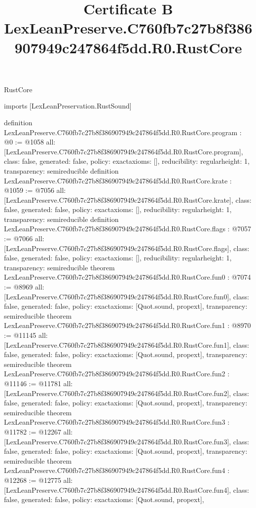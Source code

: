 \begin{lexlean}{RustCore}
\title{Certificate B LexLeanPreserve.C760fb7c27b8f386907949c247864f5dd.R0.RustCore}
\begin{coremodule}
imports [LexLeanPreservation.RustSound]

definition LexLeanPreserve.C760fb7c27b8f386907949c247864f5dd.R0.RustCore.program : @0 := @1058 {
  all: [LexLeanPreserve.C760fb7c27b8f386907949c247864f5dd.R0.RustCore.program],
  class: false,
  generated: false,
  policy: exact{axioms: []},
  reducibility: regular{height: 1},
  transparency: semireducible
}
definition LexLeanPreserve.C760fb7c27b8f386907949c247864f5dd.R0.RustCore.krate : @1059 := @7056 {
  all: [LexLeanPreserve.C760fb7c27b8f386907949c247864f5dd.R0.RustCore.krate],
  class: false,
  generated: false,
  policy: exact{axioms: []},
  reducibility: regular{height: 1},
  transparency: semireducible
}
definition LexLeanPreserve.C760fb7c27b8f386907949c247864f5dd.R0.RustCore.flags : @7057 := @7066 {
  all: [LexLeanPreserve.C760fb7c27b8f386907949c247864f5dd.R0.RustCore.flags],
  class: false,
  generated: false,
  policy: exact{axioms: []},
  reducibility: regular{height: 1},
  transparency: semireducible
}
theorem LexLeanPreserve.C760fb7c27b8f386907949c247864f5dd.R0.RustCore.fun0 : @7074 := @8969 {
  all: [LexLeanPreserve.C760fb7c27b8f386907949c247864f5dd.R0.RustCore.fun0],
  class: false,
  generated: false,
  policy: exact{axioms: [Quot.sound, propext]},
  transparency: semireducible
}
theorem LexLeanPreserve.C760fb7c27b8f386907949c247864f5dd.R0.RustCore.fun1 : @8970 := @11145 {
  all: [LexLeanPreserve.C760fb7c27b8f386907949c247864f5dd.R0.RustCore.fun1],
  class: false,
  generated: false,
  policy: exact{axioms: [Quot.sound, propext]},
  transparency: semireducible
}
theorem LexLeanPreserve.C760fb7c27b8f386907949c247864f5dd.R0.RustCore.fun2 : @11146 := @11781 {
  all: [LexLeanPreserve.C760fb7c27b8f386907949c247864f5dd.R0.RustCore.fun2],
  class: false,
  generated: false,
  policy: exact{axioms: [Quot.sound, propext]},
  transparency: semireducible
}
theorem LexLeanPreserve.C760fb7c27b8f386907949c247864f5dd.R0.RustCore.fun3 : @11782 := @12267 {
  all: [LexLeanPreserve.C760fb7c27b8f386907949c247864f5dd.R0.RustCore.fun3],
  class: false,
  generated: false,
  policy: exact{axioms: [Quot.sound, propext]},
  transparency: semireducible
}
theorem LexLeanPreserve.C760fb7c27b8f386907949c247864f5dd.R0.RustCore.fun4 : @12268 := @12775 {
  all: [LexLeanPreserve.C760fb7c27b8f386907949c247864f5dd.R0.RustCore.fun4],
  class: false,
  generated: false,
  policy: exact{axioms: [Quot.sound, propext]},
}
\end{coremodule}
\end{lexlean}
